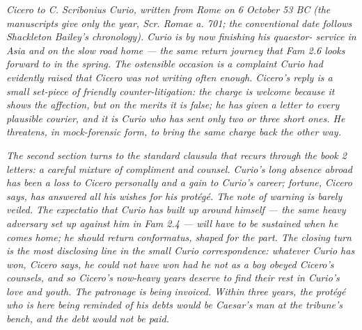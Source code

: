 
\textit{Cicero to C. Scribonius Curio, written from Rome on 6
October 53 BC (the manuscripts give only the year, \textit{Scr.
Romae a. 701}; the conventional date follows Shackleton
Bailey's chronology). Curio is by now finishing his quaestor-
service in Asia and on the slow road home --- the same return
journey that Fam 2.6 looks forward to in the spring. The
ostensible occasion is a complaint Curio had evidently raised
that Cicero was not writing often enough. Cicero's reply is a
small set-piece of friendly counter-litigation: the charge is
welcome because it shows the affection, but on the merits it is
false; he has given a letter to every plausible courier, and it
is Curio who has sent only two or three short ones. He
threatens, in mock-forensic form, to bring the same charge
back the other way.}

\textit{The second section turns to the standard \textit{
clausula} that recurs through the book 2 letters: a careful
mixture of compliment and counsel. Curio's long absence
abroad has been a loss to Cicero personally and a gain to
Curio's career; fortune, Cicero says, has answered all his
wishes for his prot\'eg\'e. The note of warning is barely
veiled. The \textit{expectatio} that Curio has built up around
himself --- the same heavy adversary set up against him in
Fam 2.4 --- will have to be sustained when he comes home; he
should return \textit{conformatus}, shaped for the part. The
closing turn is the most disclosing line in the small Curio
correspondence: whatever Curio has won, Cicero says, he could
not have won had he not as a boy obeyed Cicero's counsels, and
so Cicero's now-heavy years deserve to find their rest in
Curio's love and youth. The patronage is being invoiced. Within
three years, the prot\'eg\'e who is here being reminded of his
debts would be Caesar's man at the tribune's bench, and the
debt would not be paid.}
